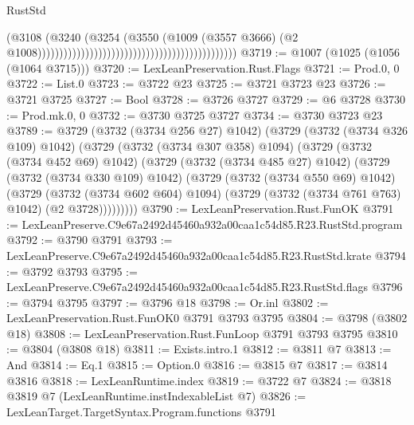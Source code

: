 \begin{lexlean}{RustStd}
\begin{coremodule}
                                                                                    (@3108
                                                                                      (@3240
                                                                                        (@3254
                                                                                          (@3550
                                                                                            (@1009
                                                                                              (@3557
                                                                                                @3666)
                                                                                              (@2
                                                                                                @1008))))))))))))))))))))))))))))))))))))))))))))))
@3719 := @1007 (@1025 (@1056 (@1064 @3715)))
@3720 := LexLeanPreservation.Rust.Flags
@3721 := Prod.{0, 0}
@3722 := List.{0}
@3723 := @3722 @23
@3725 := @3721 @3723 @23
@3726 := @3721 @3725
@3727 := Bool
@3728 := @3726 @3727
@3729 := @6 @3728
@3730 := Prod.mk.{0, 0}
@3732 := @3730 @3725 @3727
@3734 := @3730 @3723 @23
@3789 := @3729
    (@3732 (@3734 @256 @27) @1042)
    (@3729
      (@3732 (@3734 @326 @109) @1042)
      (@3729
        (@3732 (@3734 @307 @358) @1094)
        (@3729
          (@3732 (@3734 @452 @69) @1042)
          (@3729
            (@3732 (@3734 @485 @27) @1042)
            (@3729
              (@3732 (@3734 @330 @109) @1042)
              (@3729
                (@3732 (@3734 @550 @69) @1042)
                (@3729
                  (@3732 (@3734 @602 @604) @1094)
                  (@3729 (@3732 (@3734 @761 @763) @1042) (@2 @3728)))))))))
@3790 := LexLeanPreservation.Rust.FunOK
@3791 := LexLeanPreserve.C9e67a2492d45460a932a00caa1c54d85.R23.RustStd.program
@3792 := @3790 @3791
@3793 := LexLeanPreserve.C9e67a2492d45460a932a00caa1c54d85.R23.RustStd.krate
@3794 := @3792 @3793
@3795 := LexLeanPreserve.C9e67a2492d45460a932a00caa1c54d85.R23.RustStd.flags
@3796 := @3794 @3795
@3797 := @3796 @18
@3798 := Or.inl
@3802 := LexLeanPreservation.Rust.FunOK0 @3791 @3793 @3795
@3804 := @3798 (@3802 @18)
@3808 := LexLeanPreservation.Rust.FunLoop @3791 @3793 @3795
@3810 := @3804 (@3808 @18)
@3811 := Exists.intro.{1}
@3812 := @3811 @7
@3813 := And
@3814 := Eq.{1}
@3815 := Option.{0}
@3816 := @3815 @7
@3817 := @3814 @3816
@3818 := LexLeanRuntime.index
@3819 := @3722 @7
@3824 := @3818 @3819 @7 (LexLeanRuntime.instIndexableList @7)
@3826 := LexLeanTarget.TargetSyntax.Program.functions @3791

\end{coremodule}
\end{lexlean}
